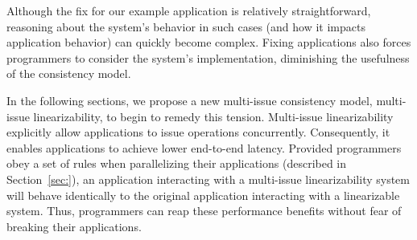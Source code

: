 Although the fix for our example application is relatively straightforward,
reasoning about the system's behavior in such cases (and how it impacts application behavior)
can quickly become complex.
Fixing applications also forces programmers to consider the system's implementation,
diminishing the usefulness of the consistency model.

In the following sections, we propose a new multi-issue consistency model, multi-issue linearizability, to begin to remedy this tension. Multi-issue linearizability explicitly allow applications to issue operations concurrently. Consequently, it enables applications to achieve lower end-to-end latency. Provided programmers obey a set of rules when parallelizing their applications (described in Section~\ref{sec:}), an application interacting with a multi-issue linearizability system will behave identically to the original application interacting with a linearizable system. Thus, programmers can reap these performance benefits without fear of breaking their applications.
